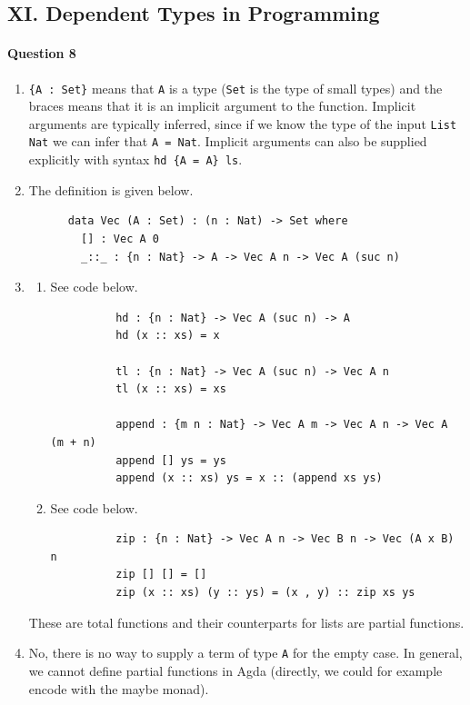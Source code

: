 \documentclass[11pt,a4paper,twoside]{article}
\begin{document}
\subsection*{XI. Dependent Types in Programming}

\paragraph*{Question 8}
\begin{enumerate}[label=(\alph*)]
  \item \lstinline|{A : Set}| means that \lstinline|A| is a type (\lstinline|Set|
    is the type of small types) and the braces means that it is an implicit argument
    to the function. Implicit arguments are typically inferred, since if we know the 
    type of the input \lstinline|List Nat| we can infer that \lstinline|A = Nat|.
    Implicit arguments can also be supplied explicitly with syntax \lstinline|hd {A = A} ls|.
  \item The definition is given below.
    \begin{lstlisting}
      data Vec (A : Set) : (n : Nat) -> Set where
        [] : Vec A 0
        _::_ : {n : Nat} -> A -> Vec A n -> Vec A (suc n)
    \end{lstlisting}
  \item 
    \begin{enumerate}[label=(\roman*)]
      \item See code below.
        \begin{lstlisting}
          hd : {n : Nat} -> Vec A (suc n) -> A
          hd (x :: xs) = x

          tl : {n : Nat} -> Vec A (suc n) -> Vec A n
          tl (x :: xs) = xs

          append : {m n : Nat} -> Vec A m -> Vec A n -> Vec A (m + n)
          append [] ys = ys 
          append (x :: xs) ys = x :: (append xs ys)
        \end{lstlisting}
      \item See code below.
        \begin{lstlisting}
          zip : {n : Nat} -> Vec A n -> Vec B n -> Vec (A x B) n
          zip [] [] = []
          zip (x :: xs) (y :: ys) = (x , y) :: zip xs ys
        \end{lstlisting}
    \end{enumerate}
    These are total functions and their counterparts for lists are partial functions.
  \item No, there is no way to supply a term of type \lstinline|A| for the empty case.
    In general, we cannot define partial functions in Agda (directly, we could for example
    encode with the maybe monad).
\end{enumerate}
\end{document}
